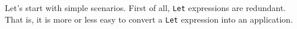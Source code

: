 \documentclass{beamer}
\begin{document}
\begin{frame}
  Let's start with simple scenarios. First of all,
  \texttt{Let} expressions are redundant. That is,
  it is more or less easy to convert a \texttt{Let}
  expression into an application. 
\end{frame}

\end{document}
